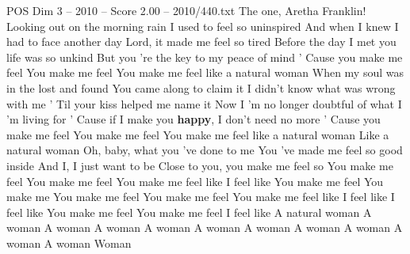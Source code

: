 \begin{textsample}{POS Dim 3 – 2010 – Score 2.00 – 2010/440.txt}  \label{ex:f3_pos_027}
The one, Aretha Franklin!
Looking out on the morning rain I used to feel so uninspired And when I knew I had to face another day Lord, it made me feel so tired Before the day I met you life was so unkind But you 're the key to my peace of mind ' Cause you make me feel You make me feel You make me feel like a natural woman When my soul was in the lost and found You came along to claim it I didn't know what was wrong with me ' Til your kiss helped me name it Now I 'm no longer doubtful of what I 'm living for ' Cause if I make you \textbf{happy}, I don't need no more ' Cause you make me feel You make me feel You make me feel like a natural woman Like a natural woman Oh, baby, what you 've done to me You 've made me feel so good inside And I, I just want to be Close to you, you make me feel so You make me feel You make me feel You make me feel like I feel like You make me feel You make me You make me feel You make me feel You make me feel like I feel like I feel like You make me feel You make me feel I feel like A natural woman A woman A woman A woman A woman A woman A woman A woman A woman A woman A woman Woman

\end{textsample}
